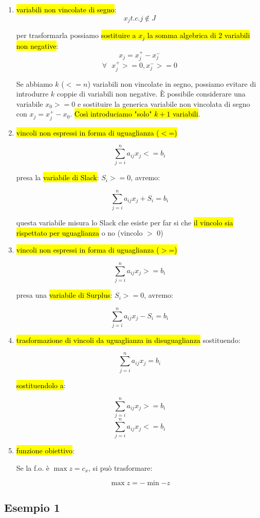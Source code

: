 \begin{enumerate}
	\item \hl{variabili non vincolate di segno}: $$x_j t.c. j \notin J$$

		per trasformarla possiamo \hl{sostituire a $x_j$ la somma algebrica di 2 variabili non negative}: $$x_j = x_j^+ - x_j^-$$ $$\forall\ \ \ x_j^+ >= 0, x_j^- >= 0$$

		Se abbiamo $k$ ($<= n$) variabili non vincolate in segno, possiamo evitare di introdurre $k$ coppie di variabili non negative. È possibile considerare una variabile $x_0 >= 0$ e sostituire la generica variabile non vincolata di segno con $x_j = x_j ^+ - x_0$. \hl{Così introduciamo "solo" $k+1$ variabili}.
	
	\item \hl{vincoli non espressi in forma di uguaglianza ($<$=)}
		
		$$\sum_{j=i}^n a_{ij} x_j <= b_i$$
		
		presa la \hl{variabile di Slack}: $S_i >= 0$, avremo:
	
		$$\sum_{j=i}^n a_{ij} x_j + S_i = b_i$$
	
	
		questa variabile misura lo Slack che esiste per far si che \hl{il vincolo sia rispettato per uguaglianza} o no (vincolo $>$ 0)
		
	\item \hl{vincoli non espressi in forma di uguaglianza ($>$=)}
	
		$$\sum_{j=i}^n a_{ij} x_j >= b_i$$
		
		presa una \hl{variabile di Surplus}: $S_i >= 0$, avremo:
		
		$$\sum_{j=i}^n a_{ij} x_j - S_i = b_i$$
		
	\item \hl{trasformazione di vincoli da uguaglianza in disuguaglianza} sostituendo:

		$$\sum_{j=i}^n a_{ij} x_j = b_i$$
		
		\hl{sostituendolo a}:
		
		$$\sum_{j=i}^n a_{ij} x_j >= b_i$$
		$$\sum_{j=i}^n a_{ij} x_j <= b_i$$
		
	\item \hl{funzione obiettivo}:
	
		Se la f.o. è $\max z = c_x$, si può trasformare:
	
		$$\max z = -\min {-z}$$

	
\end{enumerate}


\subsection{Esempio 1}

